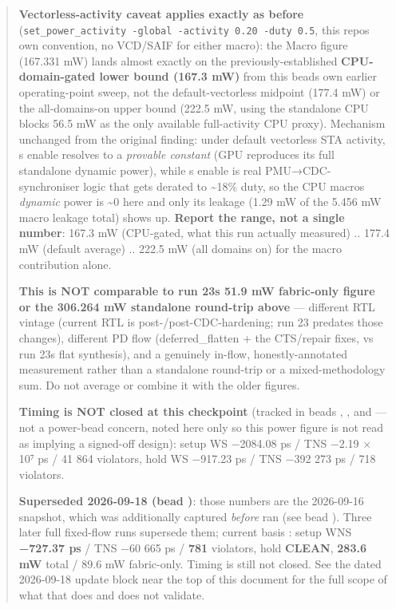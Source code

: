 \begin{record}
\begin{quote}
\textbf{Vectorless-activity caveat applies exactly as before}
(\texttt{set\_\allowbreak{}power\_\allowbreak{}activity\ -\allowbreak{}global\ -\allowbreak{}activity\ 0.\allowbreak{}20\ -\allowbreak{}duty\ 0.\allowbreak{}5},
this repo\textquotesingle s own convention, no VCD/SAIF for either
macro): the Macro figure (167.331 mW) lands almost exactly on the
previously-established \textbf{CPU-domain-gated lower bound (167.3 mW)}
from this bead\textquotesingle s own earlier operating-point sweep, not
the default-vectorless midpoint (177.4 mW) or the all-domains-on upper
bound (222.5 mW, using the standalone CPU block\textquotesingle s 56.5
mW as the only available full-activity CPU proxy). Mechanism unchanged
from the original finding: under default vectorless STA activity,
\textquotesingle s enable resolves to a
\emph{provable constant} (GPU reproduces its full standalone dynamic
power), while \textquotesingle s enable is real
PMU→CDC-synchroniser logic that gets derated to \textasciitilde18\%
duty, so the CPU macro\textquotesingle s \emph{dynamic} power is
\textasciitilde0 here and only its leakage (1.29 mW of the 5.456 mW
macro leakage total) shows up. \textbf{Report the range, not a single
number}: 167.3 mW (CPU-gated, what this run actually measured) .. 177.4
mW (default average) .. 222.5 mW (all domains on) for the macro
contribution alone.

\textbf{This is NOT comparable to run 23\textquotesingle s 51.9 mW
fabric-only figure or the 306.264 mW standalone round-trip above} ---
different RTL vintage (current RTL is
post-/\allowbreak{}post-CDC-hardening; run 23 predates those
changes), different PD flow (deferred\_\allowbreak{}flatten + the
 CTS/\allowbreak{}repair fixes, vs run 23\textquotesingle s
flat synthesis), and a genuinely in-flow, honestly-annotated measurement
rather than a standalone round-trip or a mixed-methodology sum. Do not
average or combine it with the older figures.

\textbf{Timing is NOT closed at this checkpoint} (tracked in beads
, , and  --- not a power-bead concern,
noted here only so this power figure is not read as implying a
signed-off design): setup WS −2084.08 ps / TNS −2.19 × 10⁷ ps / 41 864
violators, hold WS −917.23 ps / TNS −392 273 ps / 718 violators.

\ok{} \textbf{Superseded 2026-09-18 (bead )}: those numbers
are the 2026-09-16  snapshot, which was additionally
captured \emph{before}  ran (see bead
). Three later full fixed-flow runs supersede them; current
basis : setup WNS \textbf{−727.37 ps} /
TNS −60 665 ps / \textbf{781} violators, hold \textbf{CLEAN},
\textbf{283.6 mW} total / 89.6 mW fabric-only. Timing is still not
closed. See the dated 2026-09-18 update block near the top of this
document for the full scope of what that does and does not validate.


\end{quote}
\end{record}
